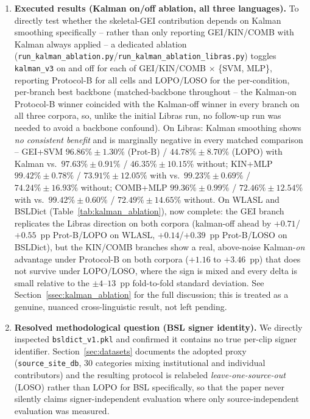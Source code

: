 \documentclass[journal]{IEEEtran}
\begin{document}
\begin{enumerate}
\item \textbf{Executed results (Kalman on/off ablation, all three languages).} To directly test whether the skeletal-GEI contribution depends on Kalman smoothing specifically -- rather than only reporting GEI/KIN/COMB with Kalman always applied -- a dedicated ablation (\texttt{run\_kalman\_ablation.py}/\texttt{run\_kalman\_ablation\_libras.py}) toggles \texttt{kalman\_v3} on and off for each of GEI/KIN/COMB $\times$ \{SVM, MLP\}, reporting Protocol-B for all cells and LOPO/LOSO for the per-condition, per-branch best backbone (matched-backbone throughout -- the Kalman-on Protocol-B winner coincided with the Kalman-off winner in every branch on all three corpora, so, unlike the initial Libras run, no follow-up run was needed to avoid a backbone confound). On Libras: Kalman smoothing shows \emph{no consistent benefit} and is marginally negative in every matched comparison -- GEI+SVM $96.86\%\pm1.30\%$ (Prot-B) / $44.78\%\pm8.70\%$ (LOPO) with Kalman vs.\ $97.63\%\pm0.91\%$ / $46.35\%\pm10.15\%$ without; KIN+MLP $99.42\%\pm0.78\%$ / $73.91\%\pm12.05\%$ with vs.\ $99.23\%\pm0.69\%$ / $74.24\%\pm16.93\%$ without; COMB+MLP $99.36\%\pm0.99\%$ / $72.46\%\pm12.54\%$ with vs.\ $99.42\%\pm0.60\%$ / $72.49\%\pm14.65\%$ without. On WLASL and BSLDict (Table~\ref{tab:kalman_ablation}), now complete: the GEI branch replicates the Libras direction on both corpora (kalman-off ahead by $+0.71$/$+0.55$~pp Prot-B/LOPO on WLASL, $+0.14$/$+0.39$~pp Prot-B/LOSO on BSLDict), but the KIN/COMB branches show a real, above-noise Kalman-\emph{on} advantage under Protocol-B on both corpora ($+1.16$ to $+3.46$~pp) that does not survive under LOPO/LOSO, where the sign is mixed and every delta is small relative to the $\pm4$--$13$~pp fold-to-fold standard deviation. See Section~\ref{ssec:kalman_ablation} for the full discussion; this is treated as a genuine, nuanced cross-linguistic result, not left pending.
\item \textbf{Resolved methodological question (BSL signer identity).} We directly inspected \texttt{bsldict\_v1.pkl} and confirmed it contains no true per-clip signer identifier. Section~\ref{sec:datasets} documents the adopted proxy (\texttt{source\_site\_db}, $30$ categories mixing institutional and individual contributors) and the resulting protocol is relabeled \emph{leave-one-source-out} (LOSO) rather than LOPO for BSL specifically, so that the paper never silently claims signer-independent evaluation where only source-independent evaluation was measured.
\end{enumerate}
\end{document}
